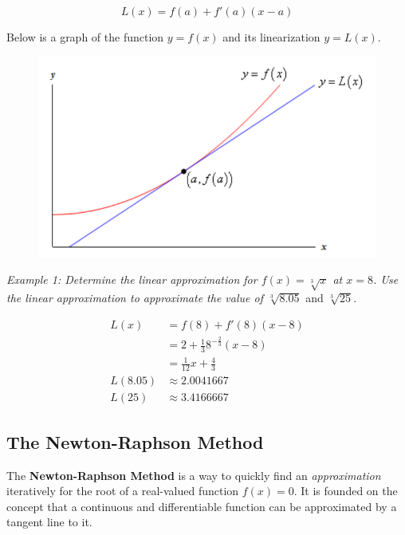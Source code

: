         \begin{equation*}
            L(x) = f(a) + f'(a)(x-a)
        \end{equation*}

        \noindent Below is a graph of the function $y=f(x)$ and its linearization $y=L(x)$.

        \begin{figure}[hbt!]
            \centering
            \includegraphics[scale=0.6]{Resources/Unit3DiffferentiationApps/Linearization}
        \end{figure}

        \pagebreak
        \noindent \color{blue} \textit{Example 1: Determine the linear approximation for
        $f(x)=\sqrt[3]{x}$ at $x=8$. Use the linear approximation to approximate the value of
        $\sqrt[3]{8.05}$} and $\sqrt[3]{25}$. \color{black}

        \begin{align*}
            L(x)        &= f(8) + f'(8)(x-8) \\
            &= 2 + \frac{1}{3}8^{-\frac{2}{3}}(x-8) \\
            &= \frac{1}{12}x + \frac{4}{3} \\
            L(8.05)     &\approx 2.0041667 \\
            L(25)       &\approx 3.4166667
        \end{align*}



    \subsection{The Newton-Raphson Method}
        The \textbf{Newton-Raphson Method} is a way to quickly find an \textit{approximation}
        iteratively for the root of a real-valued function $f(x)=0$. It is founded on the concept
        that a continuous and differentiable function can be approximated by a tangent line to it. \\

